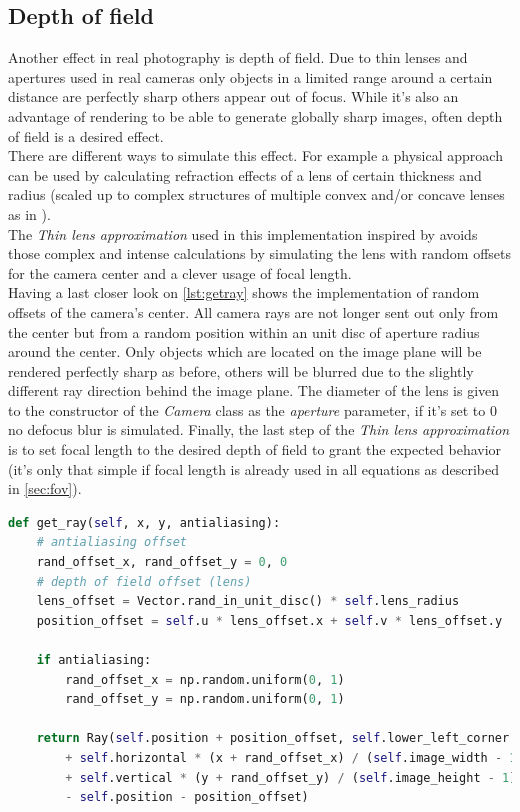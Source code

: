 \documentclass[]{article}
\begin{document}
		\subsection{Depth of field}
		\label{sec:depthoffield}
			Another effect in real photography is depth of field. Due to thin lenses and apertures used in real cameras only objects in a limited range around a certain distance are perfectly sharp others appear out of focus. While it's also an advantage of rendering to be able to generate globally sharp images, often depth of field is a desired effect. 
			\\
			There are different ways to simulate this effect. For example a physical approach can be used by calculating refraction effects of a lens of certain thickness and radius (scaled up to complex structures of multiple convex and/or concave lenses as in \cite{PBR}). 
			\\
			The \emph{Thin lens approximation} used in this implementation inspired by \cite{Shirley2020RTW1} avoids those complex and intense calculations by simulating the lens with random offsets for the camera center and a clever usage of focal length.
			\\
			Having a last closer look on \cref{lst:getray} shows the implementation of random offsets of the camera's center. All camera rays are not longer sent out only from the center but from a random position within an unit disc of aperture radius around the center. Only objects which are located on the image plane will be rendered perfectly sharp as before, others will be blurred due to the slightly different ray direction behind the image plane. The diameter of the lens is given to the constructor of the \emph{Camera} class as the \emph{aperture} parameter, if it's set to 0 no defocus blur is simulated. Finally, the last step of the \emph{Thin lens approximation} is to set focal length to the desired depth of field to grant the expected behavior (it's only that simple if focal length is already used in all equations as described in \cref{sec:fov}). 
					
			\begin{lstlisting}[caption={Method to generate a ray for given pixel coordinates using antialisaing and thin lens approximation}, language=Python, label=lst:getray]
def get_ray(self, x, y, antialiasing):
	# antialiasing offset
	rand_offset_x, rand_offset_y = 0, 0
	# depth of field offset (lens)
	lens_offset = Vector.rand_in_unit_disc() * self.lens_radius
	position_offset = self.u * lens_offset.x + self.v * lens_offset.y
	
	if antialiasing:
		rand_offset_x = np.random.uniform(0, 1)
		rand_offset_y = np.random.uniform(0, 1)
	
	return Ray(self.position + position_offset, self.lower_left_corner 
		+ self.horizontal * (x + rand_offset_x) / (self.image_width - 1) 
		+ self.vertical * (y + rand_offset_y) / (self.image_height - 1) 
		- self.position - position_offset)
			\end{lstlisting}
	
\end{document}
